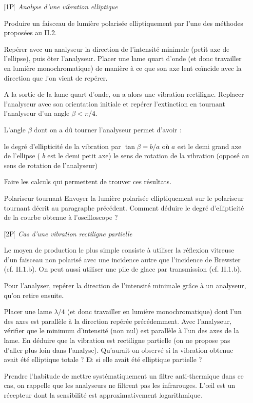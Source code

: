 \documentclass{article}%
\begin{document}
    [1P] \textit{Analyse d'une vibration elliptique}

Produire un faisceau de lumière polarisée elliptiquement par l'une des méthodes proposées au II.2.

Repérer avec un analyseur la direction de l'intensité minimale (petit axe de l'ellipse), puis ôter l'analyseur. Placer une lame quart d'onde (et donc travailler en lumière monochromatique) de manière à ce que son axe lent coïncide avec la direction que l'on vient de repérer.

A la sortie de la lame quart d'onde, on a alors une vibration rectiligne. Replacer l'analyseur avec son orientation initiale et repérer l'extinction en tournant l'analyseur d'un angle $\beta < \pi /4$.

L'angle $\beta$ dont on a dû tourner l'analyseur permet d'avoir :

    le degré d'ellipticité de la vibration par $\tan \beta = b/a$ où $a$ est le demi grand axe de l'ellipse ( $b$ est le demi petit axe)
    le sens de rotation de la vibration (opposé au sens de rotation de l'analyseur)

Faire les calculs qui permettent de trouver ces résultats.

Polariseur tournant 
    Envoyer la lumière polarisée elliptiquement sur le polariseur tournant décrit au paragraphe précédent. Comment déduire le degré d'ellipticité de la courbe obtenue à l'oscilloscope ?

    [2P] \textit{Cas d'une vibration rectiligne partielle}

Le moyen de production le plus simple consiste à utiliser la réflexion vitreuse d'un faisceau non polarisé avec une incidence autre que l'incidence de Brewster (cf. II.1.b). On peut aussi utiliser une pile de glace par transmission (cf. II.1.b).

Pour l'analyser, repérer la direction de l'intensité minimale grâce à un analyseur, qu'on retire ensuite.

Placer une lame $\lambda/4$ (et donc travailler en lumière monochromatique) dont l'un des axes est parallèle à la direction repérée précédemment. Avec l'analyseur, vérifier que le minimum d'intensité (non nul) est parallèle à l'un des axes de la lame. En déduire que la vibration est rectiligne partielle (on ne propose pas d'aller plus loin dans l'analyse). Qu'aurait-on observé si la vibration obtenue avait été elliptique totale ? Et si elle avait été elliptique partielle ?


Prendre l'habitude de mettre systématiquement un filtre anti-thermique dans ce cas, on rappelle que les analyseurs ne filtrent pas les infrarouges.
L'œil est un récepteur dont la sensibilité est approximativement logarithmique.
\end{document}
